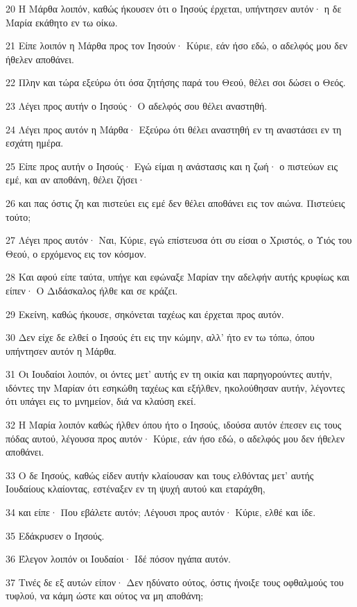 \par 20 Η Μάρθα λοιπόν, καθώς ήκουσεν ότι ο Ιησούς έρχεται, υπήντησεν αυτόν· η δε Μαρία εκάθητο εν τω οίκω.
\par 21 Είπε λοιπόν η Μάρθα προς τον Ιησούν· Κύριε, εάν ήσο εδώ, ο αδελφός μου δεν ήθελεν αποθάνει.
\par 22 Πλην και τώρα εξεύρω ότι όσα ζητήσης παρά του Θεού, θέλει σοι δώσει ο Θεός.
\par 23 Λέγει προς αυτήν ο Ιησούς· Ο αδελφός σου θέλει αναστηθή.
\par 24 Λέγει προς αυτόν η Μάρθα· Εξεύρω ότι θέλει αναστηθή εν τη αναστάσει εν τη εσχάτη ημέρα.
\par 25 Είπε προς αυτήν ο Ιησούς· Εγώ είμαι η ανάστασις και η ζωή· ο πιστεύων εις εμέ, και αν αποθάνη, θέλει ζήσει·
\par 26 και πας όστις ζη και πιστεύει εις εμέ δεν θέλει αποθάνει εις τον αιώνα. Πιστεύεις τούτο;
\par 27 Λέγει προς αυτόν· Ναι, Κύριε, εγώ επίστευσα ότι συ είσαι ο Χριστός, ο Υιός του Θεού, ο ερχόμενος εις τον κόσμον.
\par 28 Και αφού είπε ταύτα, υπήγε και εφώναξε Μαρίαν την αδελφήν αυτής κρυφίως και είπεν· Ο Διδάσκαλος ήλθε και σε κράζει.
\par 29 Εκείνη, καθώς ήκουσε, σηκόνεται ταχέως και έρχεται προς αυτόν.
\par 30 Δεν είχε δε ελθεί ο Ιησούς έτι εις την κώμην, αλλ' ήτο εν τω τόπω, όπου υπήντησεν αυτόν η Μάρθα.
\par 31 Οι Ιουδαίοι λοιπόν, οι όντες μετ' αυτής εν τη οικία και παρηγορούντες αυτήν, ιδόντες την Μαρίαν ότι εσηκώθη ταχέως και εξήλθεν, ηκολούθησαν αυτήν, λέγοντες ότι υπάγει εις το μνημείον, διά να κλαύση εκεί.
\par 32 Η Μαρία λοιπόν καθώς ήλθεν όπου ήτο ο Ιησούς, ιδούσα αυτόν έπεσεν εις τους πόδας αυτού, λέγουσα προς αυτόν· Κύριε, εάν ήσο εδώ, ο αδελφός μου δεν ήθελεν αποθάνει.
\par 33 Ο δε Ιησούς, καθώς είδεν αυτήν κλαίουσαν και τους ελθόντας μετ' αυτής Ιουδαίους κλαίοντας, εστέναξεν εν τη ψυχή αυτού και εταράχθη,
\par 34 και είπε· Που εβάλετε αυτόν; Λέγουσι προς αυτόν· Κύριε, ελθέ και ίδε.
\par 35 Εδάκρυσεν ο Ιησούς.
\par 36 Έλεγον λοιπόν οι Ιουδαίοι· Ιδέ πόσον ηγάπα αυτόν.
\par 37 Τινές δε εξ αυτών είπον· Δεν ηδύνατο ούτος, όστις ήνοιξε τους οφθαλμούς του τυφλού, να κάμη ώστε και ούτος να μη αποθάνη;
